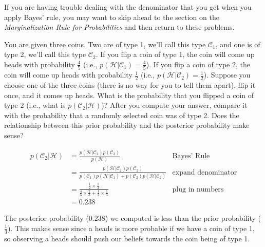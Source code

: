 \documentclass[assignment01_Solutions]{subfiles}
\begin{document}
\begin{exercise}[(20 minutes)]
\begin{notice}
If you are having trouble dealing with the denominator that you get when you apply Bayes' rule, you may want to skip ahead to the section on the \emph{Marginalization Rule for Probabilities} and then return to these problems.
\end{notice}
\bes
\item You are given three coins.  Two are of type 1, we'll call this type $\mathcal{C}_1$, and one is of type 2, we'll call this type $\mathcal{C}_2$. If you flip a coin of type 1, the coin will come up heads with probability $\frac{4}{5}$ (i.e., $p(\mathcal{H} | \mathcal{C}_1) = \frac{4}{5}$). If you flip a coin of type 2, the coin will come up heads with probability $\frac{1}{2}$ (i.e., $p(\mathcal{H} | \mathcal{C}_2) = \frac{1}{2}$).  Suppose you choose one of the three coins (there is no way for you to tell them apart), flip it once, and it comes up heads.  What is the probability that you flipped a coin of type 2 (i.e., what is $p(\mathcal{C}_2 | \mathcal{H})$)?  After you compute your answer, compare it with the probability that a randomly selected coin was of type 2.  Does the relationship between this prior probability and the posterior probability make sense?

\begin{boxedsolution}
\begin{align}
p(\mathcal{C}_2 | \mathcal{H}) &= \frac{p(\mathcal{H} | \mathcal{C}_2) p(\mathcal{C}_2)}{p(\mathcal{H})} & \mbox{Bayes' Rule} \nonumber \\
&=  \frac{p(\mathcal{H} | \mathcal{C}_2) p(\mathcal{C}_2)}{p(\mathcal{C}_1) p(\mathcal{H}|\mathcal{C}_1) + p(\mathcal{C}_2) p(\mathcal{H}|\mathcal{C}_2)} & \mbox{expand denominator} \nonumber \\
&= \frac{ \frac{1}{2} \times \frac{1}{3}}{\frac{4}{5} \times \frac{2}{3} + \frac{1}{2} \times \frac{1}{3}} &\mbox{plug in numbers} \nonumber \\
&= 0.238 \nonumber
\end{align}

The posterior probability ($0.238$) we computed is less than the prior probability ($\frac{1}{3}$).  This makes sense since a heads is more probable if we have a coin of type 1, so observing a heads should push our beliefs towards the coin being of type 1.
\end{boxedsolution}



\end{exercise}
\end{document}
